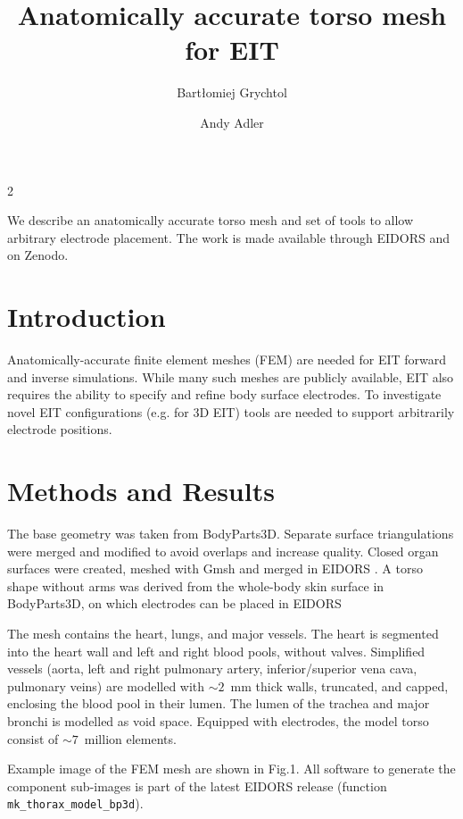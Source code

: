 \documentclass[10pt,a4paper]{article}
\title{Anatomically accurate torso mesh for EIT
\vspace{-0.5ex}} %
\author[1]{Bartłomiej Grychtol}
\author[1]{Andy Adler}
\affil[1]{Systems and Computer Engineering, Carleton University, Ottawa, Canada, \protect\href{mailto:adler@sce.carleton.ca}{\underline{adler@sce.carleton.ca}}}
\date{}
\begin{document}
\maketitle
\thispagestyle{firstpage}
\vspace{-1.5cm}

\begin{multicols}{2}

We describe an anatomically accurate torso mesh and set of tools to allow
arbitrary electrode placement. The work is made available through EIDORS and
on Zenodo.

\section{Introduction}
Anatomically-accurate finite element meshes (FEM) are needed for EIT forward
and inverse simulations. While many such meshes are publicly available, 
EIT also requires the ability to specify and refine body surface electrodes.
To investigate novel EIT configurations (e.g.{} for 3D EIT) tools are needed
to support arbitrarily electrode positions. 

\section{Methods and Results}
The base geometry was taken from BodyParts3D\cite{mitsuhashi2008bp3d}.
Separate surface triangulations were merged and modified to avoid overlaps
and increase quality. Closed organ surfaces were created, meshed with 
Gmsh \cite{gauzaine2009gmsh} and merged in {EIDORS} \cite{adler2006}. 
A torso shape without arms was derived from the whole-body skin surface
in BodyParts3D, on which electrodes can be placed in EIDORS 
\cite{grychtol2013elec}

The mesh contains the heart, lungs, and major vessels. The heart is segmented
into the heart wall and left and right blood pools, without valves. 
Simplified vessels (aorta, left and right pulmonary artery, inferior/superior 
vena cava, pulmonary veins) are modelled with $\sim 2$~mm thick walls, truncated, 
and capped, enclosing the blood pool in their lumen.
The lumen of the trachea and major bronchi is modelled as void space. 
Equipped with electrodes, the model torso consist of $\sim 7$~million elements.


Example image of the FEM mesh are shown in Fig.1. All software to generate the
component sub-images is part of the latest EIDORS release \cite{adler2024eidors}
(function \verb|mk_thorax_model_bp3d|).


\end{multicols}
\end{document}
